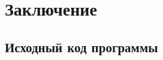 \documentclass{matmex-diploma-custom}
\begin{document}
\section*{Заключение}


\nocite{*}


\begin{appendices}
\section{Исходный код программы}
    
    
    
    
    
    
\end{appendices}
\end{document}
